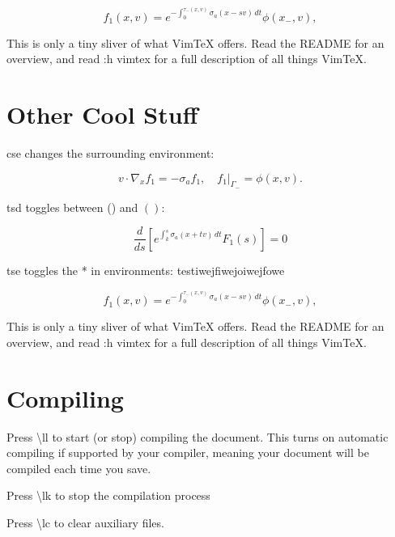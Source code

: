 \documentclass{article}
\newcommand{\lk}{\textbackslash{}lk }
\newcommand{\lc}{\textbackslash{}lc }
\renewcommand{\ll}{\textbackslash{}ll }
\begin{document}
\begin{equation}
  f_1(x, v) = e^{-\int_0^{\tau_-(x, v)} \sigma_a(x - sv)\,dt} \phi(x_-, v),
\end{equation}

This is only a tiny sliver of what VimTeX offers.
Read the README for an overview, and read :h vimtex for a full description of
all things VimTeX.



\section{Other Cool Stuff}

cse changes the surrounding environment:

\begin{equation}
  v \cdot \nabla_x f_1 = -\sigma_a f_1, \quad f_1 \rvert_{\Gamma_-} = \phi(x,v).
\end{equation}

tsd toggles between () and \( \left( \right) \):

\begin{equation*}
  \frac{d}{ds} \left[ e^{\int_k^s \sigma_a(x + tv)\,dt} F_1(s) \right] = 0
\end{equation*}

tse toggles the * in environments:
testiwejfiwejoiwejfowe

\begin{equation}
  f_1(x, v) = e^{-\int_0^{\tau_-(x, v)} \sigma_a(x - sv)\,dt} \phi(x_-, v),
\end{equation}

This is only a tiny sliver of what VimTeX offers.
Read the README for an overview, and read :h vimtex for a full description of
all things VimTeX.




\section{Compiling}

Press \ll to start (or stop) compiling the document.
This turns on automatic compiling if supported by your compiler, meaning your
document will be compiled each time you save.

Press \lk to stop the compilation process

Press \lc to clear auxiliary files.
\end{document}
